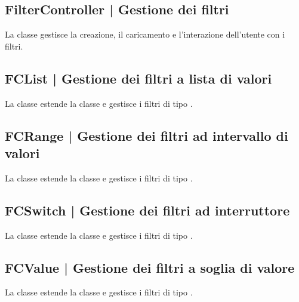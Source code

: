 \documentclass[10pt,a4paper,headinclude,footinclude,hidelinks]{scrreprt} %
\begin{document}
	\subsection[FilterController]{FilterController | Gestione dei filtri}
	\label{sec:stage:design:controller:filter}
	La classe \textit{} gestisce la creazione, il caricamento e l'interazione dell'utente con i filtri.

	\subsection[FCList]{FCList | Gestione dei filtri a lista di valori}
	\label{sec:stage:design:controller:filter-list}
	La classe \textit{} estende la classe \textit{} e gestisce i filtri di tipo \textit{}.

	\subsection[FCRange]{FCRange | Gestione dei filtri ad intervallo di valori}
	\label{sec:stage:design:controller:filter-range}
	La classe \textit{} estende la classe \textit{} e gestisce i filtri di tipo \textit{}.

	\subsection[FCSwitch]{FCSwitch | Gestione dei filtri ad interruttore}
	\label{sec:stage:design:controller:filter-switch}
	La classe \textit{} estende la classe \textit{} e gestisce i filtri di tipo \textit{}.

	\subsection[FCValue]{FCValue | Gestione dei filtri a soglia di valore}
	\label{sec:stage:design:controller:filter-value}
	La classe \textit{} estende la classe \textit{} e gestisce i filtri di tipo \textit{}.
\end{document}
